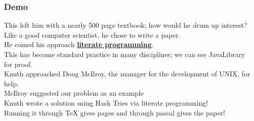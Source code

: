 \begin{frame}
\frametitle{Demo}
\noindent This left him with a nearly 500 page textbook; how would he drum up interest?\\
Like a good computer scientist, he chose to write a paper.\\
He coined his approach \textbf{\underline{literate programming}}.\\
This has become standard practice in many disciplines; we can see JavaLibrary for proof.\\ 
Knuth approached Doug McIlroy, the manager for the development of UNIX, for help.\\
McIlroy suggested our problem as an example\\
Knuth wrote a solution using Hash Tries via literate programming!\\
Running it through TeX gives pages and through pascal gives the paper!
\end{frame}

